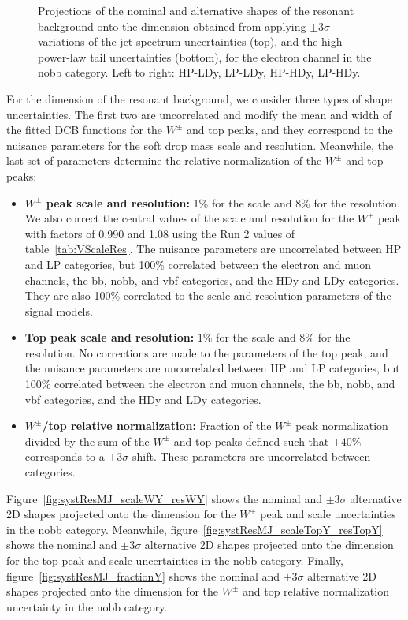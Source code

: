 \begin{figure}[htbp]
  \caption{
    Projections of the nominal and alternative shapes of the resonant background onto the \MVV dimension obtained from applying $\pm3\sigma$ variations of the jet \pt spectrum uncertainties (top), and the high-\MVV power-law tail uncertainties (bottom), for the electron channel in the nobb category.
    Left to right: HP-LDy, LP-LDy, HP-HDy, LP-HDy.
  }
  \label{fig:systResMVV_MVVScale_Tail}
\end{figure}

For the \MJ dimension of the resonant background, we consider three types of shape uncertainties.
The first two are uncorrelated and modify the mean and width of the fitted DCB functions for the $W^\pm$ and top peaks, and they correspond to the nuisance parameters for the soft drop mass scale and resolution.
Meanwhile, the last set of parameters determine the relative normalization of the $W^\pm$ and top peaks:
\begin{itemize}
  \item {\bfseries $W^\pm$ peak scale and resolution:} 1\% for the scale and 8\% for the resolution.
  We also correct the central values of the scale and resolution for the $W^\pm$ peak with factors of 0.990 and 1.08 using the Run 2 values of table~\ref{tab:VScaleRes}.
  The nuisance parameters are uncorrelated between HP and LP categories, but 100\% correlated between the electron and muon channels, the bb, nobb, and vbf categories, and the HDy and LDy categories.
  They are also 100\% correlated to the \MJ scale and resolution parameters of the signal models.
  \item {\bfseries Top peak scale and resolution:} 1\% for the scale and 8\% for the resolution.
  No corrections are made to the parameters of the top peak, and the nuisance parameters are uncorrelated between HP and LP categories, but 100\% correlated between the electron and muon channels, the bb, nobb, and vbf categories, and the HDy and LDy categories.
  \item {\bfseries $W^\pm$/top relative normalization:} Fraction of the $W^\pm$ peak normalization divided by the sum of the $W^\pm$ and top peaks defined such that $\pm40\%$ corresponds to a $\pm3\sigma$ shift.
  These parameters are uncorrelated between categories.
\end{itemize}
Figure~\ref{fig:systResMJ_scaleWY_resWY} shows the nominal and $\pm3\sigma$ alternative 2D shapes projected onto the \MJ dimension for the $W^\pm$ peak and scale uncertainties in the nobb category.
Meanwhile, figure~\ref{fig:systResMJ_scaleTopY_resTopY} shows the nominal and $\pm3\sigma$ alternative 2D shapes projected onto the \MJ dimension for the top peak and scale uncertainties in the nobb category.
Finally, figure~\ref{fig:systResMJ_fractionY} shows the nominal and $\pm3\sigma$ alternative 2D shapes projected onto the \MJ dimension for the $W^\pm$ and top relative normalization uncertainty in the nobb category.

